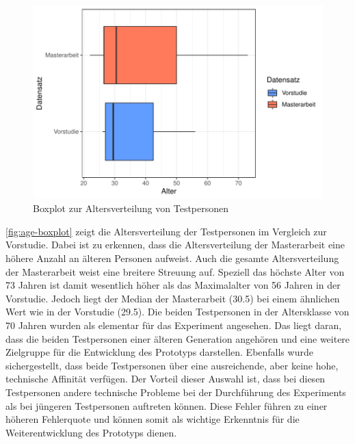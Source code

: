 \begin{figure}[!ht]
    \centering
    \includegraphics[width=1\columnwidth]{figures/boxplot.pdf}
    \caption{\label{fig:age-boxplot}Boxplot zur Altersverteilung von Testpersonen}
\end{figure}

\autoref{fig:age-boxplot} zeigt die Altersverteilung der Testpersonen im Vergleich zur Vorstudie.
Dabei ist zu erkennen, dass die Altersverteilung der Masterarbeit eine höhere Anzahl an älteren Personen aufweist.
Auch die gesamte Altersverteilung der Masterarbeit weist eine breitere Streuung auf.
Speziell das höchste Alter von 73 Jahren ist damit wesentlich höher als das Maximalalter von 56 Jahren in der Vorstudie.
Jedoch liegt der Median der Masterarbeit (30.5) bei einem ähnlichen Wert wie in der Vorstudie (29.5).
Die beiden Testpersonen in der Altersklasse von 70 Jahren wurden als elementar für das Experiment angesehen.
Das liegt daran, dass die beiden Testpersonen einer älteren Generation angehören und eine weitere Zielgruppe für die Entwicklung des Prototyps darstellen.
Ebenfalls wurde sichergestellt, dass beide Testpersonen über eine ausreichende, aber keine hohe, technische Affinität verfügen.
Der Vorteil dieser Auswahl ist, dass bei diesen Testpersonen andere technische Probleme bei der Durchführung des Experiments als bei jüngeren Testpersonen auftreten können.
Diese Fehler führen zu einer höheren Fehlerquote und können somit als wichtige Erkenntnis für die Weiterentwicklung des Prototyps dienen.\\

